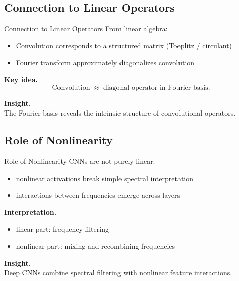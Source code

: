 \documentclass[aspectratio=169,11pt]{beamer}
\begin{document}
\subsection{Connection to Linear Operators}
\begin{frame}[t,allowframebreaks]{Connection to Linear Operators}
\small
From linear algebra:

\begin{itemize}
    \item Convolution corresponds to a structured matrix (Toeplitz / circulant)
    \item Fourier transform approximately diagonalizes convolution
\end{itemize}

\textbf{Key idea.}\\ \[
\text{Convolution} \;\approx\; \text{diagonal operator in Fourier basis}.
\]

\textbf{Insight.}\\ The Fourier basis reveals the intrinsic structure of convolutional operators.
\end{frame}

\subsection{Role of Nonlinearity}
\begin{frame}[t,allowframebreaks]{Role of Nonlinearity}
\small
CNNs are not purely linear:

\begin{itemize}
    \item nonlinear activations break simple spectral interpretation
    \item interactions between frequencies emerge across layers
\end{itemize}

\textbf{Interpretation.}\\ \begin{itemize}
    \item linear part: frequency filtering
    \item nonlinear part: mixing and recombining frequencies
\end{itemize}

\textbf{Insight.}\\ Deep CNNs combine spectral filtering with nonlinear feature interactions.
\end{frame}
\end{document}
